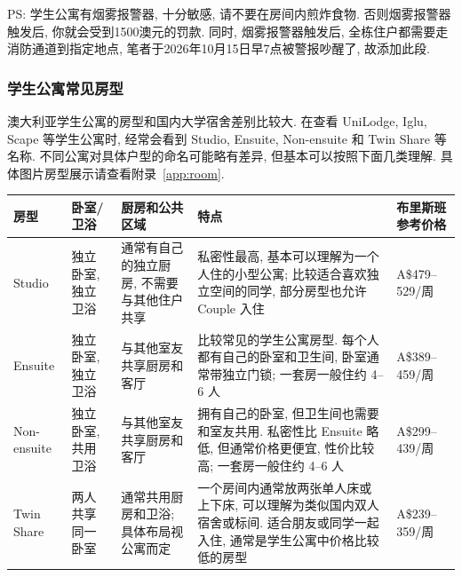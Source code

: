 \documentclass{jit-qut}
\begin{document}
PS: 学生公寓有烟雾报警器, 十分敏感, 请不要在房间内煎炸食物. 否则烟雾报警器触发后, 你就会受到1500澳元的罚款. 同时, 烟雾报警器触发后, 全栋住户都需要走消防通道到指定地点, 笔者于2026年10月15日早7点被警报吵醒了, 故添加此段.

\subsubsection{学生公寓常见房型}

澳大利亚学生公寓的房型和国内大学宿舍差别比较大. 在查看 UniLodge, Iglu, Scape 等学生公寓时, 经常会看到 Studio, Ensuite, Non-ensuite 和 Twin Share 等名称. 不同公寓对具体户型的命名可能略有差异, 但基本可以按照下面几类理解. 具体图片房型展示请查看附录~\ref{app:room}. 

\scriptsize
\renewcommand{\arraystretch}{1.18}

\begin{longtable}{@{}p{}p{}p{}p{}p{}@{}}

\toprule

房型 & 卧室/卫浴 & 厨房和公共区域 & 特点 & 布里斯班参考价格 \\

\midrule

\endhead

\bottomrule

\endfoot

Studio & 独立卧室, 独立卫浴 & 通常有自己的独立厨房, 不需要与其他住户共享 & 私密性最高, 基本可以理解为一个人住的小型公寓; 比较适合喜欢独立空间的同学, 部分房型也允许 Couple 入住 & A\$479--529/周 \\

Ensuite & 独立卧室, 独立卫浴 & 与其他室友共享厨房和客厅 & 比较常见的学生公寓房型. 每个人都有自己的卧室和卫生间, 卧室通常带独立门锁; 一套房一般住约 4--6 人 & A\$389--459/周 \\

Non-ensuite & 独立卧室, 共用卫浴 & 与其他室友共享厨房和客厅 & 拥有自己的卧室, 但卫生间也需要和室友共用. 私密性比 Ensuite 略低, 但通常价格更便宜, 性价比较高; 一套房一般住约 4--6 人 & A\$299--439/周 \\

Twin Share & 两人共享同一卧室 & 通常共用厨房和卫浴; 具体布局视公寓而定 & 一个房间内通常放两张单人床或上下床, 可以理解为类似国内双人宿舍或标间. 适合朋友或同学一起入住, 通常是学生公寓中价格比较低的房型 & A\$239--359/周 \\

\end{longtable}
\end{document}
